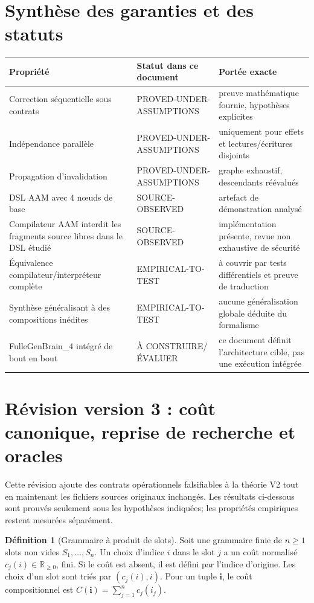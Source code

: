 \documentclass[11pt,a4paper]{article}
\theoremstyle{definition}
\newtheorem{definition}{Définition}[section]
\theoremstyle{plain}
\theoremstyle{remark}
\begin{document}
\section{Synthèse des garanties et des statuts}
\begin{longtable}{p{}p{}p{}}
\toprule Propriété & Statut dans ce document & Portée exacte \\
\midrule
Correction séquentielle sous contrats & PROVED-UNDER-ASSUMPTIONS & preuve mathématique fournie, hypothèses explicites \\
Indépendance parallèle & PROVED-UNDER-ASSUMPTIONS & uniquement pour effets et lectures/écritures disjoints \\
Propagation d'invalidation & PROVED-UNDER-ASSUMPTIONS & graphe exhaustif, descendants réévalués \\
DSL AAM avec 4 nœuds de base & SOURCE-OBSERVED & artefact de démonstration analysé \\
Compilateur AAM interdit les fragments source libres dans le DSL étudié & SOURCE-OBSERVED & implémentation présente, revue non exhaustive de sécurité \\
Équivalence compilateur/interpréteur complète & EMPIRICAL-TO-TEST & à couvrir par tests différentiels et preuve de traduction \\
Synthèse généralisant à des compositions inédites & EMPIRICAL-TO-TEST & aucune généralisation globale déduite du formalisme \\
FulleGenBrain\_4 intégré de bout en bout & À CONSTRUIRE/ÉVALUER & ce document définit l'architecture cible, pas une exécution intégrée \\
\bottomrule
\end{longtable}


\section{Révision version 3 : coût canonique, reprise de recherche et oracles}
\label{sec:theory-v3-synthesis}
Cette révision ajoute des contrats opérationnels falsifiables à la théorie V2 tout en maintenant les fichiers sources originaux inchangés. Les résultats ci-dessous sont prouvés seulement sous les hypothèses indiquées; les propriétés empiriques restent mesurées séparément.

\begin{definition}[Grammaire à produit de slots]
Soit une grammaire finie de \(n\geq1\) slots non vides \(S_1,\dots,S_n\). Un choix d'indice \(i\) dans le slot \(j\) a un coût normalisé \(c_j(i)\in\mathbb{R}_{\geq0}\), fini. Si le coût est absent, il est défini par l'indice d'origine. Les choix d'un slot sont triés par \((c_j(i),i)\). Pour un tuple \(\mathbf{i}\), le coût compositionnel est \(C(\mathbf{i})=\sum_{j=1}^{n} c_j(i_j)\).
\end{definition}
\end{document}
